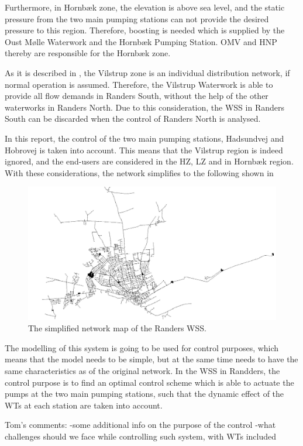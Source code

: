 Furthermore, in Hornbæk zone, the elevation is above sea level, and the static pressure from the two main pumping stations can not provide the desired pressure to this region. Therefore, boosting is needed which is supplied by the Oust Mølle Waterwork and the Hornbæk Pumping Station. OMV and HNP thereby are responsible for the Hornbæk zone.

As it is described in , the Vilstrup zone is an individual distribution network, if normal operation is assumed. Therefore, the Vilstrup Waterwork is able to provide all flow demands in Randers South, without the help of the other waterworks in Randers North. Due to this consideration, the WSS in Randers South can be discarded when the control of Randers North is analysed. 

In this report, the control of the two main pumping stations, Hadsundvej and Hobrovej is taken into account. This means that the Vilstrup region is indeed ignored, and the end-users are considered in the HZ, LZ and in Hornbæk region. With these considerations, the network simplifies to the following shown in 

\begin{figure}[H]
\centering
\includegraphics[width=1.02\textwidth]{report/pictures/verdo_pic2}
\caption{The simplified network map of the Randers WSS.}
\label{fig:simplified_network}
\end{figure}

The modelling of this system is going to be used for control purposes, which means that the model needs to be simple, but at the same time needs to have the same characteristics as of the original network. In the WSS in Randders, the control purpose is to find an optimal control scheme which is able to actuate the pumps at the two main pumping stations, such that the dynamic effect of the WTs at each station are taken into account. 

Tom's comments:\newline
-some additional info on the purpose of the control \newline
-what challenges should we face while controlling such system, with WTs included







